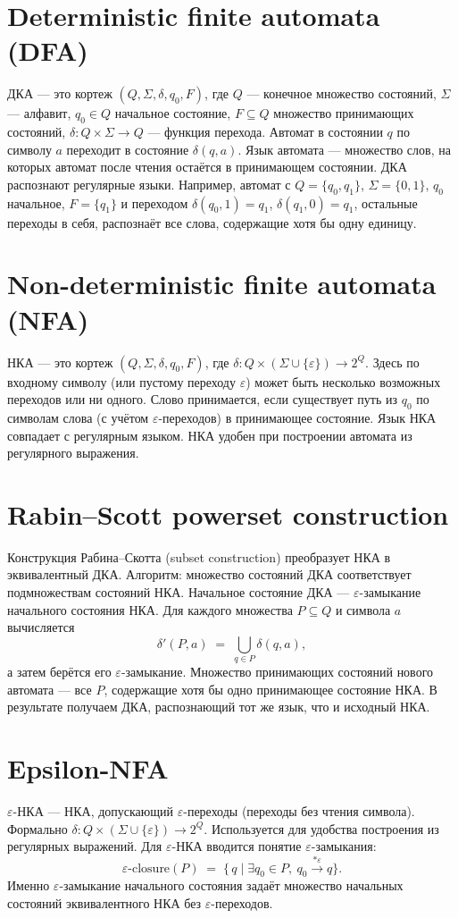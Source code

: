 \documentclass{article}
\begin{document}
	
	\section{Deterministic finite automata (DFA)}
	ДКА --- это кортеж $(Q, \Sigma, \delta, q_0, F)$, где $Q$ --- конечное множество состояний, $\Sigma$ --- алфавит, $q_0\in Q$ начальное состояние, $F\subseteq Q$ множество принимающих состояний, $\delta\colon Q\times\Sigma\to Q$ --- функция перехода. Автомат в состоянии $q$ по символу $a$ переходит в состояние $\delta(q,a)$. Язык автомата --- множество слов, на которых автомат после чтения остаётся в принимающем состоянии. ДКА распознают регулярные языки. Например, автомат с $Q=\{q_0,q_1\}$, $\Sigma=\{0,1\}$, $q_0$ начальное, $F=\{q_1\}$ и переходом $\delta(q_0,1)=q_1$, $\delta(q_1,0)=q_1$, остальные переходы в себя, распознаёт все слова, содержащие хотя бы одну единицу.
	
	\section{Non-deterministic finite automata (NFA)}
		НКА --- это кортеж $(Q,\Sigma,\delta,q_0,F)$, где $\delta\colon Q\times(\Sigma\cup\{\varepsilon\})\to 2^Q$. Здесь по входному символу (или пустому переходу $\varepsilon$) может быть несколько возможных переходов или ни одного. Слово принимается, если существует путь из $q_0$ по символам слова (с учётом $\varepsilon$-переходов) в принимающее состояние. Язык НКА совпадает с регулярным языком. НКА удобен при построении автомата из регулярного выражения.
	
	\section{Rabin--Scott powerset construction}
	Конструкция Рабина--Скотта (subset construction) преобразует НКА в эквивалентный ДКА. Алгоритм: множество состояний ДКА соответствует подмножествам состояний НКА. Начальное состояние ДКА --- $\varepsilon$-замыкание начального состояния НКА. Для каждого множества $P\subseteq Q$ и символа $a$ вычисляется 
	\[
	\delta'(P,a) \;=\; \bigcup_{q\in P}\delta(q,a),
	\]
	а затем берётся его $\varepsilon$-замыкание. Множество принимающих состояний нового автомата --- все $P$, содержащие хотя бы одно принимающее состояние НКА. В результате получаем ДКА, распознающий тот же язык, что и исходный НКА.
	
	\section{Epsilon-NFA}
	$\varepsilon$-НКА --- НКА, допускающий $\varepsilon$-переходы (переходы без чтения символа). Формально $\delta\colon Q\times(\Sigma\cup\{\varepsilon\})\to 2^Q$. Используется для удобства построения из регулярных выражений. Для $\varepsilon$-НКА вводится понятие $\varepsilon$-замыкания: 
	\[
	\varepsilon\text{-closure}(P) \;=\; \{\, q \mid \exists q_0\in P,\ q_0\stackrel{*\varepsilon}{\longrightarrow}q\}.
	\]
	Именно $\varepsilon$-замыкание начального состояния задаёт множество начальных состояний эквивалентного НКА без $\varepsilon$-переходов.
	
\end{document}
